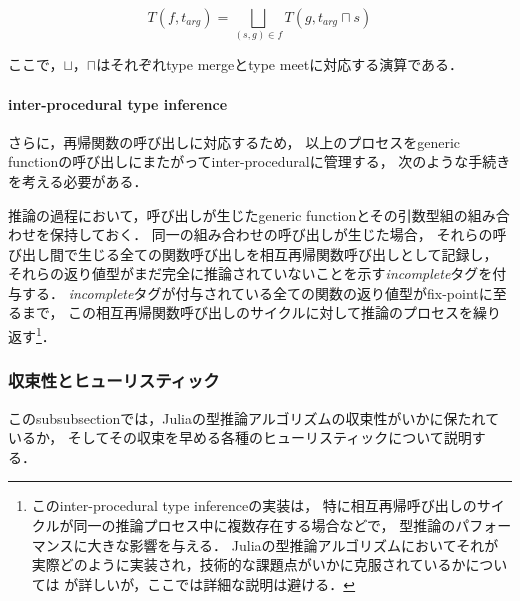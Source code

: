 \[
  T(f,t_{arg}) = \bigsqcup_{(s,g) \in f}T(g,t_{arg} \sqcap s)
\]

ここで，\(\sqcup\)，\(\sqcap\)はそれぞれtype mergeとtype meetに対応する演算である．


\paragraph{inter-procedural type inference}

さらに，再帰関数の呼び出しに対応するため，
以上のプロセスをgeneric functionの呼び出しにまたがってinter-proceduralに管理する，
次のような手続きを考える必要がある．

推論の過程において，呼び出しが生じたgeneric functionとその引数型組の組み合わせを保持しておく．
同一の組み合わせの呼び出しが生じた場合，
それらの呼び出し間で生じる全ての関数呼び出しを相互再帰関数呼び出しとして記録し，
それらの返り値型がまだ完全に推論されていないことを示す\textit{incomplete}タグを付与する．
\textit{incomplete}タグが付与されている全ての関数の返り値型がfix-pointに至るまで，
この相互再帰関数呼び出しのサイクルに対して推論のプロセスを繰り返す\footnote{
  このinter-procedural type inferenceの実装は，
  特に相互再帰呼び出しのサイクルが同一の推論プロセス中に複数存在する場合などで，
  型推論のパフォーマンスに大きな影響を与える．
  Juliaの型推論アルゴリズムにおいてそれが実際どのように実装され，技術的な課題点がいかに克服されているかについては
  \cite{jameson, jameson-revisited}が詳しいが，ここでは詳細な説明は避ける．
}．

\subsubsection{収束性とヒューリスティック} \label{subsubsection:inference-convergence-and-heuristic}

このsubsubsectionでは，Juliaの型推論アルゴリズムの収束性がいかに保たれているか，
そしてその収束を早める各種のヒューリスティックについて説明する．

